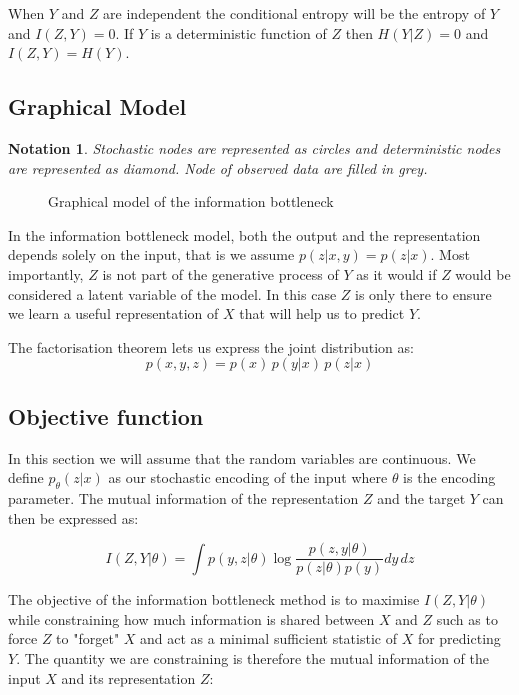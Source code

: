 \documentclass[10pt,oneside,openright]{report}
\newtheorem{notation}{Notation}
\begin{document}
When $Y$ and $Z$ are independent the conditional entropy will be the entropy of $Y$ and $I(Z, Y) = 0$. If $Y$ is a deterministic function of $Z$ then $H(Y|Z) = 0$ and $I(Z, Y) = H(Y)$. 

\subsection{Graphical Model}
\begin{notation}
Stochastic nodes are represented as circles and deterministic nodes are represented as diamond. Node of observed data are filled in grey.
\end{notation}

\begin{figure}[H]
\centering
{}
\caption{Graphical model of the information bottleneck}
\end{figure}

In the information bottleneck model, both the output and the representation depends solely on the input, that is we assume $p(z | x, y) = p(z|x)$. Most importantly, $Z$ is not part of the generative process of $Y$ as it would if $Z$ would be considered a latent variable of the model. In this case $Z$ is only there to ensure we learn a useful representation of $X$ that will help us to predict $Y$.

The factorisation theorem lets us express the joint distribution as:
$$ p(x, y, z) = p(x)\, p(y|x)\, p(z|x)$$

\subsection{Objective function}
In this section we will assume that the random variables are continuous. We define $p_\theta(z|x)$ as our stochastic encoding of the input where $\theta$ is the encoding parameter. The mutual information of the representation $Z$ and the target $Y$ can then be expressed as:

$$ I(Z, Y|\theta) = \int p(y, z|\theta) \log \frac{p(z, y|\theta)}{p(z|\theta)p(y)} dy\,dz $$

The objective of the information bottleneck method is to maximise $I(Z, Y|\theta)$ while constraining how much information is shared between $X$ and $Z$ such as to force $Z$ to "forget" $X$ and act as a minimal sufficient statistic of $X$ for predicting $Y$. The quantity we are constraining is therefore the mutual information of the input $X$ and its representation $Z$:
\end{document}
